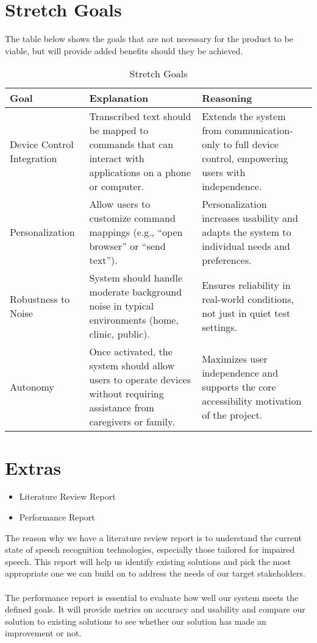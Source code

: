 \documentclass{article}
\begin{document}
\section{Stretch Goals}
The table below shows the goals that are not necessary for the product to be viable, but will provide added benefits should they be achieved.

\begin{table}[hp]
\caption{Stretch Goals}
\begin{tabularx}{\textwidth}{lXX} \\[-8pt]
\toprule
\textbf{Goal} & \textbf{Explanation} & \textbf{Reasoning}\\
\midrule
Device Control Integration & Transcribed text should be mapped to commands that can interact with applications on a phone or computer. & Extends the system from communication-only to full device control, empowering users with independence.\\
Personalization & Allow users to customize command mappings (e.g., ``open browser'' or ``send text''). & Personalization increases usability and adapts the system to individual needs and preferences.\\
Robustness to Noise & System should handle moderate background noise in typical environments (home, clinic, public). & Ensures reliability in real-world conditions, not just in quiet test settings.\\
Autonomy & Once activated, the system should allow users to operate devices without requiring assistance from caregivers or family. & Maximizes user independence and supports the core accessibility motivation of the project.\\
\bottomrule
\end{tabularx}
\end{table}

\newpage

\section{Extras}
\begin{itemize}
    \item Literature Review Report
    \item Performance Report
\end{itemize}
The reason why we have a literature review report is to understand the current state of speech recognition technologies, especially those tailored for impaired speech. This report will help us identify existing solutions and pick the most appropriate one we can build on to address the needs of our target stakeholders.
\\
\\
The performance report is essential to evaluate how well our system meets the defined goals. It will provide metrics on accuracy and usability and compare our solution to existing solutions to see whether our solution has made an improvement or not.
\end{document}
